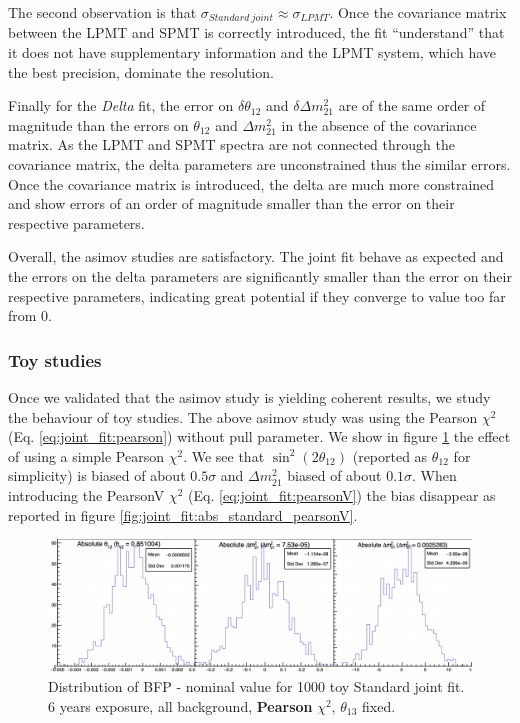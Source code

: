 \documentclass[../main.tex]{subfiles}
\begin{document}
The second observation is that $\sigma_{Standard~joint} \approx \sigma_{LPMT}$. Once the covariance matrix between the LPMT and SPMT is correctly introduced, the fit ``understand'' that it does not have supplementary information and the LPMT system, which have the best precision, dominate the resolution.

Finally for the \textit{Delta} fit, the error on $\delta \theta_{12}$ and $\delta \Delta m^2_{21}$ are of the same order of magnitude than the errors on $\theta_{12}$ and $\Delta m^2_{21}$ in the absence of the covariance matrix. As the LPMT and SPMT spectra are not connected through the covariance matrix, the delta parameters are unconstrained thus the similar errors. Once the covariance matrix is introduced, the delta are much more constrained and show errors of an order of magnitude smaller than the error on their respective parameters.

Overall, the asimov studies are satisfactory. The joint fit behave as expected and the errors on the delta parameters are significantly smaller than the error on their respective parameters, indicating great potential if they converge to value too far from 0.

\subsubsection{Toy studies}

Once we validated that the asimov study is yielding coherent results, we study the behaviour of toy studies. The above asimov study was using the Pearson $\chi^2$ (Eq. \ref{eq:joint_fit:pearson}) without pull parameter. We show in figure \ref{fig:joint_fit:abs_standard_pearson} the effect of using a simple Pearson $\chi^2$. We see that $\sin^2(2\theta_{12})$ (reported as $\theta_{12}$ for simplicity) is biased of about $0.5\sigma$ and $\Delta m^2_{21}$ biased of about $0.1\sigma$. When introducing the PearsonV $\chi^2$ (Eq. \ref{eq:joint_fit:pearsonV}) the bias disappear as reported in figure \ref{fig:joint_fit:abs_standard_pearsonV}.

\begin{figure}[ht]
  \centering
  \includegraphics[width=\linewidth]{images/joint_fit/absolute_standard_joint_pearson.png}
  \caption{Distribution of BFP - nominal value for 1000 toy Standard joint fit. 6 years exposure, all background, \textbf{Pearson} $\chi^2$, $\theta_{13}$ fixed.}
  \label{fig:joint_fit:abs_standard_pearson}
\end{figure}
\end{document}
